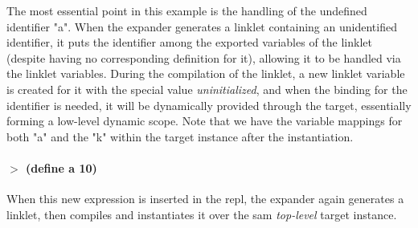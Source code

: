 The most essential point in this example is the handling of the
undefined identifier "a". When the expander generates a linklet
containing an unidentified identifier, it puts the identifier among
the exported variables of the linklet (despite having no corresponding
definition for it), allowing it to be handled via the linklet
variables. During the compilation of the linklet, a new linklet
variable is created for it with the special value
\emph{uninitialized}, and when the binding for the identifier is
needed, it will be dynamically provided through the target,
essentially forming a low-level dynamic scope. Note that we have the
variable mappings for both "a" and the "k" within the target instance
after the instantiation.

\paragraph{$>$ (define a 10)}

When this new expression is inserted in the repl, the expander again
generates a linklet, then compiles and instantiates it over the sam
\emph{top-level} target instance.

